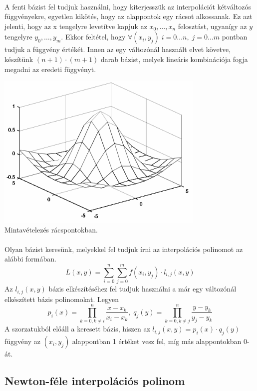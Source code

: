 \documentclass{elteikthesis}
\begin{document}
\paragraph{}
A fenti bázist fel tudjuk használni, hogy kiterjesszük az interpolációt kétváltozós függvényekre, egyetlen kikötés, hogy az alappontok egy rácsot alkossanak. Ez azt jelenti, hogy az x tengelyre levetítve kapjuk az $x_0, \dots, x_n$ felosztást, ugyanígy az $y$ tengelyre $y_0, \dots, y_m$. Ekkor feltétel, hogy $\forall (x_i, y_j) \; i = 0 \dots n, \; j = 0 \dots m$ pontban tudjuk a függvény értékét. Innen az egy változónál használt elvet követve, készítünk $(n+1) \cdot (m+1)$ darab bázist, melyek lineáris kombinációja fogja megadni az eredeti függvényt.
\begin{center}
\includegraphics[width=10cm]{pics/bivariable_grid}\\
{\footnotesize Mintavételezés rácspontokban.}
\end{center}
\paragraph{}
Olyan bázist keresünk, melyekkel fel tudjuk írni az interpolációs polinomot az alábbi formában.
$$L(x, y) = \sum_{i=0}^{n}\sum_{j=0}^{m}f(x_i, y_j) \cdot l_{i, j}(x, y)$$
Az $l_{i, j}(x,y)$ bázis elkészítéséhez fel tudjuk használni a már egy változónál elkészített bázis polinomokat. Legyen $$p_i(x) = \prod_{k = 0, k \neq i}^{n}\frac{x-x_k}{x_i-x_k},\; q_j(y) = \prod_{k = 0, k \neq j}^{n}\frac{y-y_k}{y_j-y_k}$$ A szorzatukból előáll a keresett bázis, hiszen az $l_{i, j}(x,y) = p_i(x)\cdot q_j(y)$ függvény az $(x_i, y_j)$ alappontban 1 értéket vesz fel, míg más alappontokban 0-át.
\subsection{Newton-féle interpolációs polinom}
\end{document}
